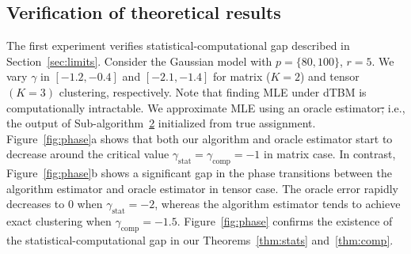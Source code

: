 \documentclass[lettersize,onecolumn,journal]{IEEEtran}
\theoremstyle{definition}
\theoremstyle{definition}
\providecommand{\DIFaddtex}[1]{{\protect\color{blue}\uwave{#1}}} %
\providecommand{\DIFdeltex}[1]{{\protect\color{red}\sout{#1}}}                      %
\providecommand{\DIFaddbegin}{} %
\providecommand{\DIFaddend}{} %
\providecommand{\DIFdelbegin}{} %
\providecommand{\DIFdelend}{} %
\providecommand{\DIFadd}[1]{\texorpdfstring{\DIFaddtex{#1}}{#1}} %
\providecommand{\DIFdel}[1]{\texorpdfstring{\DIFdeltex{#1}}{}} %
\newcommand{\DIFscaledelfig}{0.5}
\newlength{\DIFdelgraphicswidth} %
\newlength{\DIFdelgraphicsheight} %
\newcommand{\DIFaddincludegraphics}[2][]{{\color{blue}\fbox{\DIFOincludegraphics[#1]{#2}}}} %
\newcommand{\DIFdelincludegraphics}[2][]{%
\sbox{\DIFdelgraphicsbox}{\DIFOincludegraphics[#1]{#2}}%
\settoboxwidth{\DIFdelgraphicswidth}{\DIFdelgraphicsbox} %
\settoboxtotalheight{\DIFdelgraphicsheight}{\DIFdelgraphicsbox} %
\scalebox{\DIFscaledelfig}{%
\parbox[b]{\DIFdelgraphicswidth}{\usebox{\DIFdelgraphicsbox}\\[-\baselineskip] \rule{\DIFdelgraphicswidth}{0em}}\llap{\resizebox{\DIFdelgraphicswidth}{\DIFdelgraphicsheight}{%
\setlength{\unitlength}{\DIFdelgraphicswidth}%
\begin{picture}(1,1)%
\thicklines\linethickness{2pt} %
{\color[rgb]{1,0,0}\put(0,0){\framebox(1,1){}}}%
{\color[rgb]{1,0,0}\put(0,0){\line( 1,1){1}}}%
{\color[rgb]{1,0,0}\put(0,1){\line(1,-1){1}}}%
\end{picture}%
}\hspace*{3pt}}} %
} %
\DeclareRobustCommand{\DIFaddbegin}{\DIFOaddbegin \let\includegraphics\DIFaddincludegraphics} %
\DeclareRobustCommand{\DIFaddend}{\DIFOaddend \let\includegraphics\DIFOincludegraphics} %
\DeclareRobustCommand{\DIFdelbegin}{\DIFOdelbegin \let\includegraphics\DIFdelincludegraphics} %
\DeclareRobustCommand{\DIFdelend}{\DIFOaddend \let\includegraphics\DIFOincludegraphics} %
\begin{document}
\DIFdelbegin %


\DIFdelend \subsection{Verification of theoretical results}\label{subsec:num_theory}

The first experiment verifies  statistical-computational gap described in Section~\ref{sec:limits}. Consider the Gaussian model with $p = \{80, 100\}$, $r = 5$. We vary $\gamma $ in $ [-1.2, -0.4]$ and $[-2.1, -1.4]$ for matrix ($K=2$) and tensor $(K = 3)$ clustering, respectively. Note that finding MLE under dTBM is computationally intractable. We approximate MLE using an oracle estimator\DIFdelbegin \DIFdel{; }\DIFdelend \DIFaddbegin \DIFadd{, }\DIFaddend i.e., the output of Sub-algorithm~\hyperref[alg:main]{2} initialized from true assignment. Figure~\ref{fig:phase}a shows that both our algorithm and oracle estimator start to decrease around the critical value $\gamma_{\text{stat}}  = \gamma_{\text{comp}}  = -1$ in matrix case. In contrast, Figure~\ref{fig:phase}b shows a significant gap in the phase transitions between the algorithm estimator and oracle estimator in tensor case. The oracle error rapidly decreases to 0 when $\gamma_{\text{stat}} = -2$, whereas the algorithm estimator tends to achieve exact clustering when $\gamma_{\text{comp}} = -1.5$. Figure~\ref{fig:phase} confirms the existence of the statistical-computational gap in our Theorems~\ref{thm:stats} and~\ref{thm:comp}. 
\end{document}
